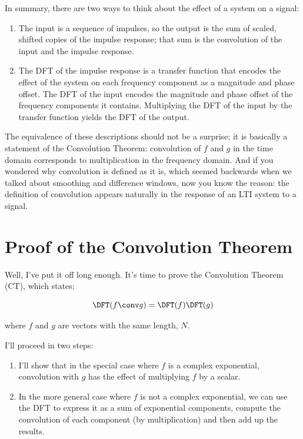 \documentclass[12pt]{book}
\begin{document}
In summary, there are two ways to think about the effect of a system
on a signal:

\begin{enumerate}

\item The input is a sequence of impulses, so the output is the sum of
  scaled, shifted copies of the impulse response; that sum is the
  convolution of the input and the impulse response.

\item The DFT of the impulse response is a transfer function that
  encodes the effect of the system on each frequency component as a
  magnitude and phase offset.  The DFT of the input encodes the
  magnitude and phase offset of the frequency components it contains.
  Multiplying the DFT of the input by the transfer function yields
  the DFT of the output.

\end{enumerate}

The equivalence of these descriptions should not be a surprise;
it is basically a statement of the Convolution Theorem:
convolution of $f$ and $g$ in the time
domain corresponds to multiplication in the frequency domain.
And if you wondered why convolution is defined as it is, which
seemed backwards when we talked about smoothing and difference
windows, now you know the reason: the definition of convolution
appears naturally in the response of an LTI system to a signal.


\section{Proof of the Convolution Theorem}

Well, I've put it off long enough.  It's time to prove the Convolution
Theorem (CT), which states:

\[ \DFT(f \conv g) = \DFT(f) \DFT(g) \]

where $f$ and $g$ are vectors with the same length, $N$.

I'll proceed in two steps:

\begin{enumerate}

\item I'll show that in the special case where $f$ is a complex
exponential, convolution with $g$ has the effect of multiplying
$f$ by a scalar.

\item In the more general case where $f$ is not a complex exponential,
we can use the DFT to express it as a sum of exponential components,
compute the convolution of each component (by multiplication) and
then add up the results.

\end{enumerate}
\end{document}
